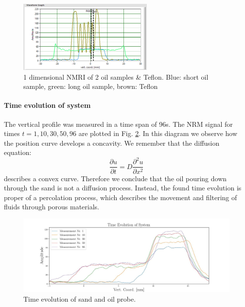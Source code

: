 \begin{figure}[!htbp]
  \begin{center}
    \includegraphics[width= 0.6\textwidth]{./Protocol images/III/three_profiles.png}
 \caption{1 dimensional NMRI of 2 oil samples \& Teflon. Blue: short oil sample, green: long oil sample, brown: Teflon}
    \label{fig:teflon}
   \end{center}
 \end{figure} 
\paragraph{Time evolution of system}
The vertical profile was measured in a time span of 96s. The NRM signal for times $t = 1,10, 30, 50, 96$ are plotted in Fig. \ref{fig:time evolution system}. In this diagram we observe how the position curve develops a concavity. We remember that the diffusion equation:
\begin{equation}
\frac{\partial u}{\partial t} = D\frac{\partial^2 u}{\partial x^2}
\end{equation}
describes a convex curve. Therefore we conclude that the oil pouring down through the sand is not a diffusion process. Instead, the found time evolution is proper of a percolation process, which describes the movement and filtering of fluids through porous materials. 
\begin{figure}[!htbp]
  \begin{center}
    \includegraphics[width= 1.0\textwidth]{./Latex images/time_evolution.jpg}
 \caption{Time evolution of sand and oil probe.}
    \label{fig:time evolution system}
   \end{center}
 \end{figure}
